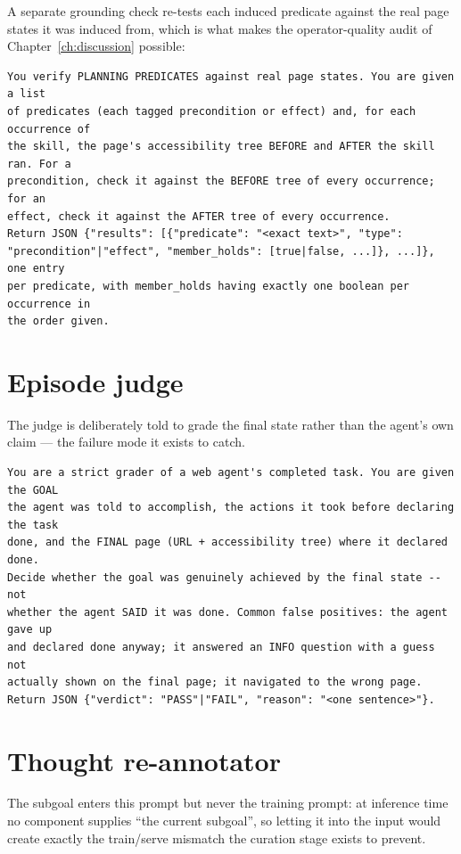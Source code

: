 \noindent
A separate grounding check re-tests each induced predicate against the real
page states it was induced from, which is what makes the operator-quality
audit of Chapter~\ref{ch:discussion} possible:

\begin{lstlisting}[style=mystyle,numbers=none,basicstyle=\scriptsize\ttfamily]
You verify PLANNING PREDICATES against real page states. You are given a list
of predicates (each tagged precondition or effect) and, for each occurrence of
the skill, the page's accessibility tree BEFORE and AFTER the skill ran. For a
precondition, check it against the BEFORE tree of every occurrence; for an
effect, check it against the AFTER tree of every occurrence.
Return JSON {"results": [{"predicate": "<exact text>", "type":
"precondition"|"effect", "member_holds": [true|false, ...]}, ...]}, one entry
per predicate, with member_holds having exactly one boolean per occurrence in
the order given.
\end{lstlisting}

\section{Episode judge}
\label{app:prompt-judge}

The judge is deliberately told to grade the final state rather than the agent's
own claim --- the failure mode it exists to catch.

\begin{lstlisting}[style=mystyle,numbers=none,basicstyle=\scriptsize\ttfamily]
You are a strict grader of a web agent's completed task. You are given the GOAL
the agent was told to accomplish, the actions it took before declaring the task
done, and the FINAL page (URL + accessibility tree) where it declared done.
Decide whether the goal was genuinely achieved by the final state -- not
whether the agent SAID it was done. Common false positives: the agent gave up
and declared done anyway; it answered an INFO question with a guess not
actually shown on the final page; it navigated to the wrong page.
Return JSON {"verdict": "PASS"|"FAIL", "reason": "<one sentence>"}.
\end{lstlisting}

\section{Thought re-annotator}
\label{app:prompt-reannotator}

The subgoal enters this prompt but never the training prompt: at inference time
no component supplies ``the current subgoal'', so letting it into the input
would create exactly the train/serve mismatch the curation stage exists to
prevent.

